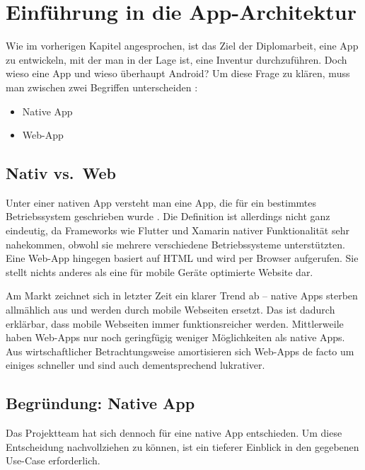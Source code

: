 \chapter{Einführung in die App-Architektur}

Wie im vorherigen Kapitel angesprochen, ist das Ziel der Diplomarbeit,
eine App zu entwickeln, mit der man in der Lage ist, eine Inventur
durchzuführen. Doch wieso eine App und wieso überhaupt Android? Um diese
Frage zu klären, muss man zwischen zwei Begriffen unterscheiden
\cite{native-vs-web}:

\begin{itemize}
\tightlist
\item
  Native App
\item
  Web-App
\end{itemize}

\hypertarget{nativ-vs.-web}{%
\section{Nativ vs.~Web}\label{nativ-vs.-web}}

Unter einer nativen App versteht man eine App, die für ein bestimmtes
Betriebssystem geschrieben wurde \cite{native-definition}. Die
Definition ist allerdings nicht ganz eindeutig, da Frameworks wie
Flutter und Xamarin nativer Funktionalität sehr nahekommen, obwohl sie
mehrere verschiedene Betriebssysteme unterstützten. Eine Web-App
hingegen basiert auf HTML und wird per Browser aufgerufen. Sie stellt
nichts anderes als eine für mobile Geräte optimierte Website dar.

Am Markt zeichnet sich in letzter Zeit ein klarer Trend ab -- native
Apps sterben allmählich aus \cite{native-trend} und werden durch mobile
Webseiten ersetzt. Das ist dadurch erklärbar, dass mobile Webseiten
immer funktionsreicher werden. Mittlerweile haben Web-Apps nur noch
geringfügig weniger Möglichkeiten als native Apps. Aus wirtschaftlicher
Betrachtungsweise amortisieren sich Web-Apps de facto um einiges
schneller und sind auch dementsprechend lukrativer.

\hypertarget{begruxfcndung-native-app}{%
\section{Begründung: Native App}\label{begruxfcndung-native-app}}

Das Projektteam hat sich dennoch für eine native App entschieden. Um
diese Entscheidung nachvollziehen zu können, ist ein tieferer Einblick
in den gegebenen Use-Case erforderlich.

